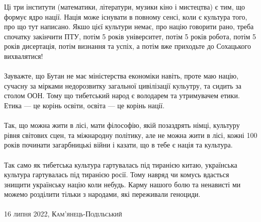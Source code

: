 Ці три інститути (математики, літератури, музики кіно і мистецтва) є тим,
що формує ядро нації. Нація може існувати в повному сенсі, коли є культура
того, про що тут написано. Якшо цієї культури немає, про націю говорити рано,
треба спочатку закінчити ПТУ, потім 5 років університет, потім 5 років робота,
потім 5 років дисертація, потім визнання та успіх, а потім вже приходьте до
Сохацького вихвалятися!
\\
\\
Зауважте, що Бутан не має міністерства економіки навіть, проте маю націю,
сучасну за мірками недорозвитку загальної цивілізації кульутру, та сидить
за столом ООН. Тому що тибетський народ є володарем та утримувачем етики.
Етика --- це корінь освіти, освіта --- це корінь нації.
\\
\\
Так, що можна жити в лісі, мати філософію, якій позаздрять німці, культуру
рівня світових сцен, та міжнародну політику, але не можна жити в лісі,
кожні 100 років починати загарбницькі війни і казати, що в тебе є нація та культура.
\\
\\
Так само як тибетська культура гартувалась під тиранією китаю, українська
культура гартувалась під тиранією росії. Тому навряд чи комусь вдасться
знищити українську націю коли небудь. Карму нашого болю та ненависті
ми можемо розділити тільки з народами, які переживали геноциди.
\\
\\
\textsc{\footnotesize 16 липня 2022, Кам'янець-Подільський}

\normalsize
